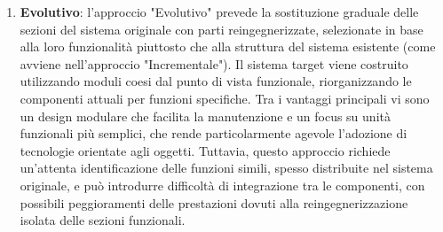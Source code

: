 \begin{enumerate}
  \item \textbf{Evolutivo}: l'approccio "Evolutivo" prevede la sostituzione graduale delle sezioni del sistema originale con parti reingegnerizzate, selezionate in base alla loro funzionalità piuttosto che alla struttura del sistema esistente (come avviene nell'approccio "Incrementale"). Il sistema target viene costruito utilizzando moduli coesi dal punto di vista funzionale, riorganizzando le componenti attuali per funzioni specifiche. Tra i vantaggi principali vi sono un design modulare che facilita la manutenzione e un focus su unità funzionali più semplici, che rende particolarmente agevole l'adozione di tecnologie orientate agli oggetti. Tuttavia, questo approccio richiede un'attenta identificazione delle funzioni simili, spesso distribuite nel sistema originale, e può introdurre difficoltà di integrazione tra le componenti, con possibili peggioramenti delle prestazioni dovuti alla reingegnerizzazione isolata delle sezioni funzionali.
\end{enumerate}

